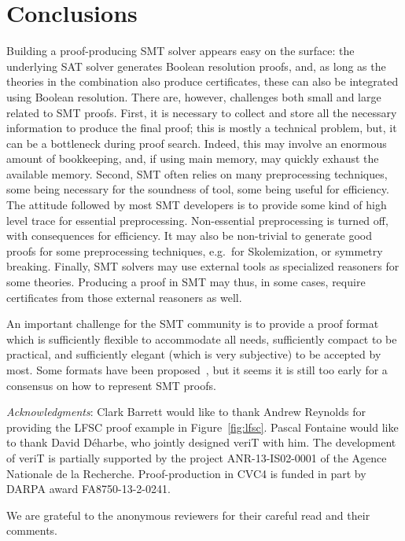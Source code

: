 \documentclass{llncs}
\begin{document}
\section{Conclusions}
\label{sec:concl}


Building a proof-producing SMT solver appears easy on the surface: the underlying SAT solver
generates Boolean resolution proofs, and, as long as the theories in the combination also
produce certificates, these can also be integrated using Boolean resolution.
There are, however, challenges both small and large related to SMT
proofs.  First, it is necessary to collect and store all the necessary
information to produce the final proof; this is mostly a technical problem, but,
it can be a bottleneck during proof search.  Indeed, this may involve an
enormous amount of bookkeeping, and, if using main memory, may quickly
exhaust the available memory.  Second, SMT often relies on many preprocessing
techniques, some being necessary for the soundness of tool, some being useful
for efficiency.  The attitude followed by most SMT developers is to provide some
kind of high level trace for essential preprocessing.  Non-essential
preprocessing is turned off, with consequences for efficiency.  It
may also be non-trivial to generate good proofs for some preprocessing
techniques, e.g.\ for Skolemization, or symmetry breaking.  Finally, SMT
solvers may use external tools as specialized reasoners for some
theories.
Producing a proof in SMT may thus, in some cases, require certificates from
those external reasoners as well.

An important challenge for the SMT community is to provide a proof format which
is sufficiently flexible to accommodate all needs, sufficiently compact to be
practical, and sufficiently elegant (which is very subjective) to be accepted by
most.  Some formats have been proposed~\cite{Besson1,dMB08,Reynolds1}, but it
seems it is still too early for a consensus on how to represent SMT proofs.


\medskip\noindent%
\emph{Acknowledgments}: Clark Barrett would like to thank Andrew Reynolds for
providing the LFSC proof example in Figure~\ref{fig:lfsc}.  Pascal Fontaine
would like to thank David D\'{e}harbe, who jointly designed veriT with him.  The
development of veriT is partially supported by the project ANR-13-IS02-0001 of
the Agence Nationale de la Recherche.  Proof-production in CVC4 is funded in
part by DARPA award FA8750-13-2-0241.

We are grateful to the anonymous reviewers for their careful read and their
comments.



\end{document}
